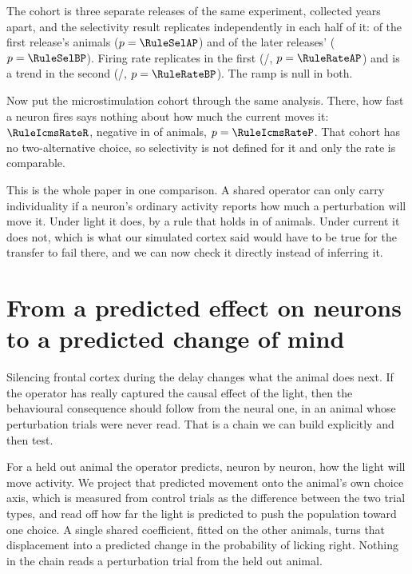 \documentclass[11pt,letterpaper]{article}
\begin{document}
The cohort is three separate releases of the same experiment, collected years apart,
and the selectivity result replicates independently in each half of it: \RuleSelA{} of
the first release's \RuleSelAN{} animals ($p = \RuleSelAP$) and \RuleSelB{} of the
later releases' \RuleSelBN{} ($p = \RuleSelBP$). Firing rate replicates in the first
(\RuleRateA{}/\RuleRateAN, $p = \RuleRateAP$) and is a trend in the second
(\RuleRateB{}/\RuleRateBN, $p = \RuleRateBP$). The ramp is null in both.

Now put the microstimulation cohort through the same analysis. There, how fast a neuron
fires says nothing about how much the current moves it: $\RuleIcmsRateR$, negative in
\RuleIcmsRateNeg{} of \RuleIcmsRateN{} animals, $p = \RuleIcmsRateP$. That cohort has no
two-alternative choice, so selectivity is not defined for it and only the rate is
comparable.

This is the whole paper in one comparison. A shared operator can only carry
individuality if a neuron's ordinary activity reports how much a perturbation will move
it. Under light it does, by a rule that holds in \RuleSelNeg{} of \RuleSelN{} animals.
Under current it does not, which is what our simulated cortex said would have to be true
for the transfer to fail there, and we can now check it directly instead of inferring it.

\section{From a predicted effect on neurons to a predicted change of mind}

Silencing frontal cortex during the delay changes what the animal does next. If the
operator has really captured the causal effect of the light, then the behavioural
consequence should follow from the neural one, in an animal whose perturbation trials
were never read. That is a chain we can build explicitly and then test.

For a held out animal the operator predicts, neuron by neuron, how the light will move
activity. We project that predicted movement onto the animal's own choice axis, which
is measured from control trials as the difference between the two trial types, and read
off how far the light is predicted to push the population toward one choice. A single
shared coefficient, fitted on the other animals, turns that displacement into a
predicted change in the probability of licking right. Nothing in the chain reads a
perturbation trial from the held out animal.
\end{document}
